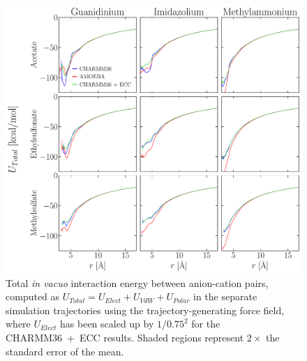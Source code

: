 \documentclass[journal=jacsat,articletitle=true,manuscript=suppinfo,layout=onecolumn]{achemso}
\begin{document}
    \begin{figure}[H]
    \begin{center}
        \includegraphics[width=1\columnwidth]{images/energy_conts_direct.pdf}
        \caption{Total \emph{in vacuo} interaction energy between anion-cation pairs, computed as $U_{Total} = U_{Elect} + U_{VdW} + U_{Polar}$ in the separate simulation trajectories using the trajectory-generating force field, where $U_{Elect}$ has been scaled up by $1/0.75^2$ for the CHARMM36~+~ECC results. Shaded regions represent $2\times$ the standard error of the mean.}
        \label{fig:energy_conts_direct}
    \end{center}
    \end{figure}
\end{document}
